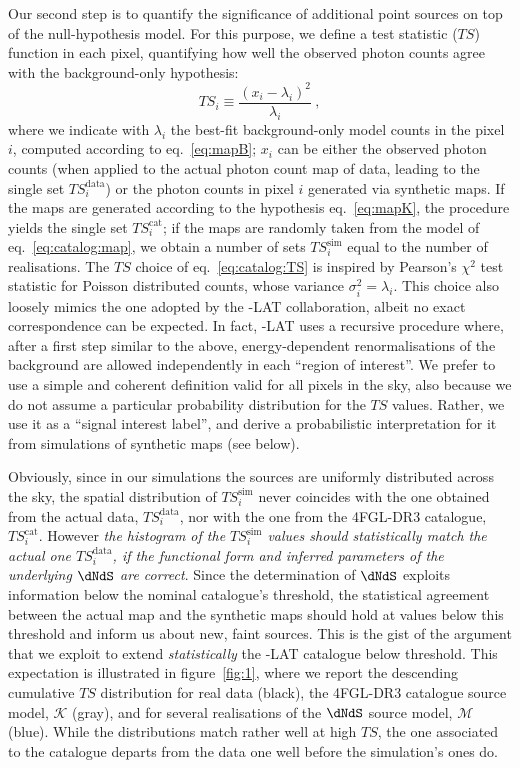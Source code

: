 \medskip
%
Our second step is to quantify the significance of additional point sources on top of the
null-hypothesis model.
%
For this purpose, we define a test statistic ($TS$) function in each pixel, quantifying how well the  observed photon counts agree with the background-only hypothesis:    
\begin{equation}
    TS_i \equiv \frac{(x_i - \lambda_i)^2}{\lambda_i}~,
\label{eq:catalog:TS}
\end{equation}
where we indicate with $\lambda_i$ the best-fit background-only model counts in the pixel $i$, computed according to eq.~\eqref{eq:mapB};  $x_i$ can be either the observed photon counts 
(when applied to the actual photon count map of data, leading to the single set $TS^\textrm{data}_i$) or the  photon counts in pixel $i$ generated via synthetic maps. If the maps are generated according to  the hypothesis eq.~\eqref{eq:mapK}, the procedure yields the single set $TS^\textrm{cat}_i$; if the maps are randomly taken from the model of eq.~\eqref{eq:catalog:map}, we obtain a number of sets $TS^\textrm{sim}_i$ equal to the number of realisations.
The $TS$ choice of eq.~\eqref{eq:catalog:TS} is inspired by Pearson's $\chi^2$ test statistic for Poisson distributed counts,
whose variance $\sigma_i^2=\lambda_i$. 
This choice also loosely mimics the one adopted by the \Fermi-LAT collaboration, albeit no exact correspondence can be expected.  In fact, \Fermi-LAT uses a recursive procedure where, after a first step similar to the above, energy-dependent renormalisations of the background are allowed independently in each ``region of interest''.  We prefer to use a simple and coherent definition valid for all pixels in the sky, also because we do not assume a particular probability distribution for the $TS$ values. Rather, we use it as a ``signal interest label'', and derive a probabilistic interpretation for it from simulations of synthetic maps (see below). 

Obviously, since in our simulations the sources are uniformly distributed across the sky, the spatial distribution of $TS^\textrm{sim}_i$  never coincides with the one obtained from the actual data, $TS^\textrm{data}_i$, nor with the one from the 4FGL-DR3 catalogue, $TS^\textrm{cat}_i$. However \textit{the histogram of the $TS^\textrm{sim}_i$ values should statistically match the actual one $TS^\textrm{data}_i$, if the functional form and inferred parameters of the underlying $\dNdS$ are correct}.  
Since the determination of $\dNdS$ exploits information below the nominal catalogue's threshold, the statistical agreement between the actual map and the synthetic maps should hold at values below this threshold and inform us about new, faint sources. This is the gist of the argument that we exploit to extend \textit{statistically} the \Fermi-LAT catalogue below threshold. This expectation is illustrated in figure~\ref{fig:1}, where we report the descending cumulative $TS$ distribution for real data (black), the 4FGL-DR3 catalogue source model, $\mathcal{K}$ (gray), and for several realisations of the $\dNdS$ source model, $\mathcal{M}$ (blue). While the distributions match rather well at high $TS$, the one associated to the catalogue departs from the data one well before the simulation's ones do. 

